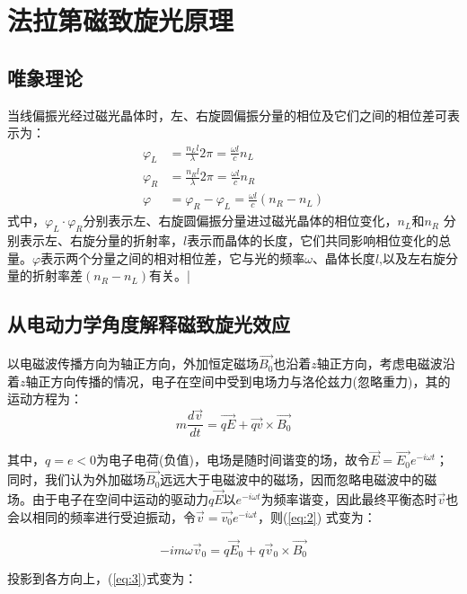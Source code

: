 \documentclass[12pt]{ctexart}
\numberwithin{equation}{section} %
\begin{document}
    \section{法拉第磁致旋光原理}
    \subsection{唯象理论}
    当线偏振光经过磁光晶体时，左、右旋圆偏振分量的相位及它们之间的相位差可表示为：
\begin{equation}
    \begin{aligned}
    \varphi_L & =\frac{n_L l}{\lambda}2\pi=\frac{\omega l}{c}n_L\\
    \varphi_R & =\frac{n_R l}{\lambda}2\pi=\frac{\omega l}{c}n_R\\
    \varphi   & =\varphi_R-\varphi_L=\frac{\omega l}{c}(n_R-n_L)
    \end{aligned}
\end{equation}
式中，$\varphi_L\cdot\varphi_R$分别表示左、右旋圆偏振分量进过磁光晶体的相位变化，$n_L$和$n_R$ 分别表示左、右旋分量的折射率，$l$表示而晶体的长度，它们共同影响相位变化的总量。$\varphi$表示两个分量之间的相对相位差，它与光的频率$\omega$、晶体长度$l$,以及左右旋分量的折射率差$(n_R-n_L)$有关。|
\subsection{从电动力学角度解释磁致旋光效应}

以电磁波传播方向为轴正方向\cite{程玉琪1991高灵敏度光纤弱磁传感器}，外加恒定磁场$\overrightarrow{B_{0}}$也沿着$z$轴正方向，考虑电磁波沿着$z$轴正方向传播的情况，电子在空间中受到电场力与洛伦兹力(忽略重力)，其的运动方程为：
\begin{equation}m\frac{d\overrightarrow{v}}{dt}=\overrightarrow{qE}+\overrightarrow{qv}\times\overrightarrow{B_{0}}
    \label{eq:2}
\end{equation}
\par 其中，$q=e<0$为电子电荷(负值)，电场是随时间谐变的场，故令$\overrightarrow{E}=\overrightarrow{E_{0}}e^{-i\omega t}$；同时，我们认为外加磁场$\vec{B_{0}}$远远大于电磁波中的磁场，因而忽略电磁波中的磁场。由于电子在空间中运动的驱动力$q\vec{E}$以$e^{-i\omega t}$为频率谐变，因此最终平衡态时$\vec{v}$也会以相同的频率进行受迫振动，令$\vec v=\vec{v_0}e^{-i\omega t}$，则(\ref{eq:2}) 式变为：

\begin{equation}
-im\omega\vec{v}_0=q\vec{E}_0+q\overrightarrow{v}_0\times\overrightarrow{B_{0}}
\label{eq:3}
\end{equation}
\par 投影到各方向上，(\ref{eq:3})式变为：
\end{document}
